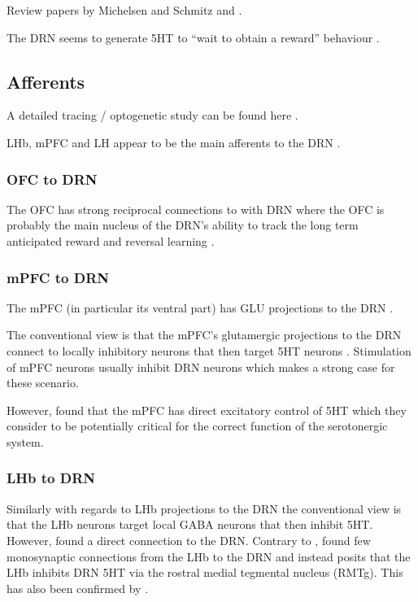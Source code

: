 \documentclass[12pt,a4paper]{article}
\begin{document}
Review papers by Michelsen and Schmitz \citep{Michelsen2007} and \citep{Nakamura2013}.

The DRN seems to generate 5HT to “wait to obtain a reward” behaviour  \citep{Nakamura2013}.

\subsection{Afferents}

A detailed tracing / optogenetic study can be found here  \citep{PollakDorocic2014}.

LHb, mPFC and LH appear to be the main afferents to the DRN \citep{Vertes2010} \citep{Sparta2014} \citep{Lee2003}.

\subsubsection{OFC to DRN}

The OFC has strong reciprocal connections to with DRN \citep{Zhou2015} where the OFC is probably the main nucleus of the DRN's ability to track the long term anticipated reward and reversal learning \citep{Roberts2011}.

\subsubsection{mPFC to DRN}

The mPFC (in particular its ventral part) has GLU projections to the DRN \citep{Goncalves2009} \citep{Lee2003}.

The conventional view is that the mPFC’s glutamergic projections to the DRN connect to locally inhibitory neurons that then target 5HT neurons \citep{Celada2001}. Stimulation of mPFC neurons usually inhibit DRN neurons which makes a strong case for these scenario.

However, \citep{PollakDorocic2014} found that the mPFC has direct excitatory control of 5HT which they consider to be potentially critical for the correct function of the serotonergic system. 

\subsubsection{LHb to DRN}

Similarly with regards to LHb projections to the DRN the conventional view is that the LHb neurons
target local GABA neurons that then inhibit 5HT. However, \citep{PollakDorocic2014} found a direct connection to the DRN. Contrary to \citep{PollakDorocic2014}, \citep{Ogawa2014} found few monosynaptic connections from the LHb to the DRN and instead posits that the LHb inhibits DRN 5HT via the rostral medial tegmental nucleus (RMTg). This has also been confirmed by \citep{Sego2014}.
\end{document}
